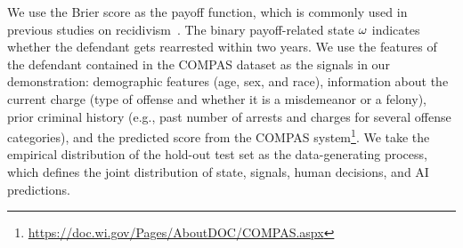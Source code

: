 We use the Brier score as the payoff function, which is commonly used in previous studies on recidivism~\citep{green2019disparate, lin2020limits, fogliato2021impact}.
The binary payoff-related state $\omega$ indicates whether the defendant gets rearrested within two years.
We use the features of the defendant contained in the COMPAS dataset as the signals in our demonstration: demographic features (age, sex, and race), information about the current
charge (type of offense and whether it is a misdemeanor or a felony), prior criminal history (e.g., past number of arrests and charges for several offense categories), and the predicted score from the COMPAS system\footnote{\url{https://doc.wi.gov/Pages/AboutDOC/COMPAS.aspx}}.
We take the empirical distribution of the hold-out test set as the data-generating process, which defines the joint distribution of state, signals, human decisions, and AI predictions.
\mvspace{-4mm}

